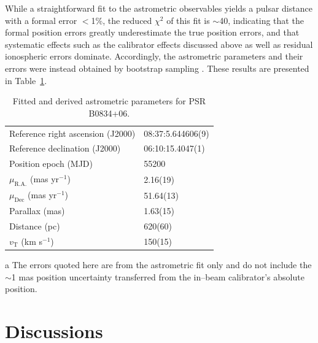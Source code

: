 \documentclass[useAMS,usenatbib]{mn2e}
\begin{document}
While a straightforward fit to the astrometric observables yields a pulsar distance with a formal error $<$1\%, the reduced $\chi^2$ of this fit is $\sim$40, indicating that the formal position errors greatly underestimate the true position errors, and that systematic effects such as the calibrator effects discussed above as well as residual ionospheric errors dominate.  Accordingly, the astrometric parameters and their errors were instead obtained by bootstrap sampling \citep{efron91a}.  These results are presented in Table~\ref{tab:vlbi}.

\begin{table}
\caption{Fitted and derived astrometric parameters for PSR B0834+06.}
\begin{threeparttable}
\begin{tabular}{ll}
\hline
Reference right ascension (J2000)\tnote{a}
							&  08:37:5.644606(9)\\
Reference declination (J2000)\tnote{a}
							&  06:10:15.4047(1)\\
Position epoch (MJD)			& 55200 \\
$\mu_{\mathrm{R.A.}}$ (mas yr$^{-1}$)	& 2.16(19) \\
$\mu_{\mathrm{Dec}}$	(mas yr$^{-1}$) & 51.64(13)  \\
Parallax (mas)	 				& 1.63(15) \\
Distance (pc)					& 620(60) \\
$v_{\mathrm T}$ (km s$^{-1}$)	& 150(15)\\
\hline
\end{tabular}
\begin{tablenotes}
\item[a]{The errors quoted here are from the astrometric fit only and do not include the $\sim$1 mas position uncertainty transferred from the in--beam calibrator's absolute position.}
\end{tablenotes}
\end{threeparttable}
\label{tab:vlbi}
\end{table}




\section{Discussions}
\end{document}
